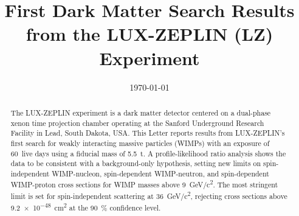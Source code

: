 \documentclass[%
 reprint,
 superscriptaddress,
 amsmath,amssymb,
 prl,
floatfix,
]{revtex4-2}
\begin{document}

\title{First Dark Matter Search Results from the LUX-ZEPLIN (LZ) Experiment}


\date{\today}%

\begin{abstract}
The LUX-ZEPLIN experiment is a dark matter detector centered on a
dual-phase xenon time projection chamber operating at the Sanford Underground Research Facility in Lead, South Dakota, USA. This Letter reports results from LUX-ZEPLIN's first search for weakly interacting massive particles (WIMPs) with an exposure of 60~live days using a fiducial mass of \SI{5.5}{t}. A profile-likelihood ratio analysis shows the data to be consistent with a background-only hypothesis, setting new limits on spin-independent WIMP-nucleon, spin-dependent WIMP-neutron, and spin-dependent WIMP-proton cross sections for WIMP masses above \SI{9}{GeV/c\squared}. The most stringent limit is set for spin-independent scattering at \SI{36}{GeV/c\squared}, rejecting cross sections above \SI{9.2e-48}{cm\squared} at the \SI{90}{\percent} confidence level. 

\end{abstract}

\maketitle




\end{document}
